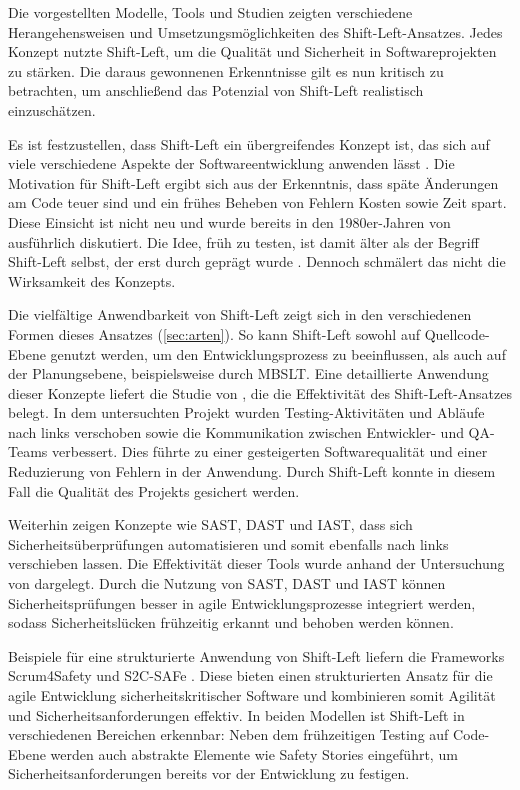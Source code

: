 Die vorgestellten Modelle, Tools und Studien zeigten verschiedene Herangehensweisen und Umsetzungsmöglichkeiten des Shift-Left-Ansatzes. Jedes Konzept nutzte Shift-Left, um die Qualität und Sicherheit in Softwareprojekten zu stärken. Die daraus gewonnenen Erkenntnisse gilt es nun kritisch zu betrachten, um anschließend das Potenzial von Shift-Left realistisch einzuschätzen.

Es ist festzustellen, dass Shift-Left ein übergreifendes Konzept ist, das sich auf viele verschiedene Aspekte der Softwareentwicklung anwenden lässt \cite{andriadi_impact_2023}. Die Motivation für Shift-Left ergibt sich aus der Erkenntnis, dass späte Änderungen am Code teuer sind und ein frühes Beheben von Fehlern Kosten sowie Zeit spart. Diese Einsicht ist nicht neu und wurde bereits in den 1980er-Jahren von \citet{boehm_software_1984} ausführlich diskutiert. Die Idee, früh zu testen, ist damit älter als der Begriff Shift-Left selbst, der erst durch \cite{smith_shift-left_2001} geprägt wurde \cite{dawoud_better_2024}. Dennoch schmälert das nicht die Wirksamkeit des Konzepts.

Die vielfältige Anwendbarkeit von Shift-Left zeigt sich in den verschiedenen Formen dieses Ansatzes (\ref{sec:arten}). So kann Shift-Left sowohl auf Quellcode-Ebene genutzt werden, um den Entwicklungsprozess zu beeinflussen, als auch auf der Planungsebene, beispielsweise durch MBSLT. Eine detaillierte Anwendung dieser Konzepte liefert die Studie von \cite{andriadi_impact_2023}, die die Effektivität des Shift-Left-Ansatzes belegt. In dem untersuchten Projekt wurden Testing-Aktivitäten und Abläufe nach links verschoben sowie die Kommunikation zwischen Entwickler- und QA-Teams verbessert. Dies führte zu einer gesteigerten Softwarequalität und einer Reduzierung von Fehlern in der Anwendung. Durch Shift-Left konnte in diesem Fall die Qualität des Projekts gesichert werden.

Weiterhin zeigen Konzepte wie SAST, DAST und IAST, dass sich Sicherheitsüberprüfungen automatisieren und somit ebenfalls nach links verschieben lassen. Die Effektivität dieser Tools wurde anhand der Untersuchung von \citet{mateo_tudela_combining_2020} dargelegt. Durch die Nutzung von SAST, DAST und IAST können Sicherheitsprüfungen besser in agile Entwicklungsprozesse integriert werden, sodass Sicherheitslücken frühzeitig erkannt und behoben werden können.

Beispiele für eine strukturierte Anwendung von Shift-Left liefern die Frameworks Scrum4Safety und S2C-SAFe \cite{barbareschi_scrum_2022} \cite{moyon_how_2020}. Diese bieten einen strukturierten Ansatz für die agile Entwicklung sicherheitskritischer Software und kombinieren somit Agilität und Sicherheitsanforderungen effektiv. In beiden Modellen ist Shift-Left in verschiedenen Bereichen erkennbar: Neben dem frühzeitigen Testing auf Code-Ebene werden auch abstrakte Elemente wie Safety Stories eingeführt, um Sicherheitsanforderungen bereits vor der Entwicklung zu festigen.

